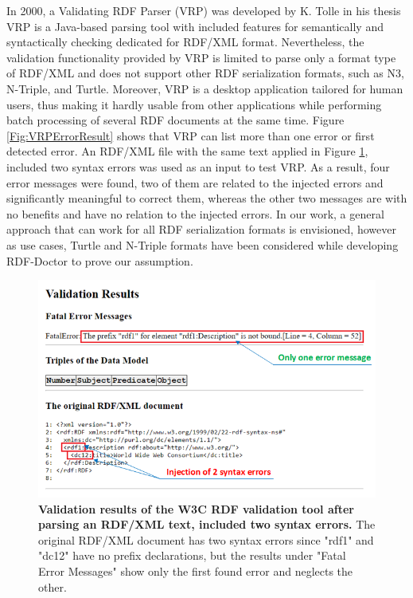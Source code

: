 In 2000, a Validating RDF Parser (VRP) \cite{karsten:Thesis:2000} was developed by K. Tolle in his thesis
VRP is a Java-based parsing tool with included features for semantically and syntactically checking dedicated for RDF/XML format. 
Nevertheless, the validation functionality provided by VRP is limited to parse only a format type of RDF/XML and does not support other RDF serialization formats, such as N3, N-Triple, and Turtle. 
Moreover, VRP is a desktop application tailored for human users, thus making it hardly usable from other applications while performing batch processing of several RDF documents at the same time.
Figure \ref{Fig:VRPErrorResult} shows that VRP can list more than one error or first detected error. 
An RDF/XML file with the same text applied in Figure \ref{Fig:errorW3RDFValidator}, included two syntax errors was used as an input to test VRP. 
As a result, four error messages were found, two of them are related to the injected errors and significantly meaningful to correct them, whereas the other two messages are with no benefits and have no relation to the injected errors. 
In our work, a general approach that can work for all RDF serialization formats is envisioned, however as use cases, Turtle and N-Triple formats have been considered while developing RDF-Doctor to prove our assumption. 
 
 \begin{figure}[ht]
		\begin{center}
			\includegraphics[scale=0.7,angle=0]{images/errorW3RDFValidator.png}
			\caption{\textbf{Validation results of the W3C RDF validation tool \cite{W3C:Validation:Online} after parsing an RDF/XML text, included two syntax errors.} The original RDF/XML document has two syntax errors since "rdf1" and "dc12" have no prefix declarations, but the results under "Fatal Error Messages" show only the first found error and neglects the other.}
			\label{Fig:errorW3RDFValidator}
		\end{center}
	\end{figure}
